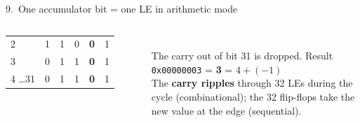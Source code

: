 \documentclass[aspectratio=169,11pt]{beamer}
\newcommand{\hx}[1]{\texttt{0x#1}}
\begin{document}
\begin{frame}{9.\ One accumulator bit = one LE in arithmetic mode}
\begin{columns}[T]
\begin{tabular}{@{}lccccc@{}}
      2 & 1 & 1 & 0 & \textbf{0} & 1 \\
      3 & 0 & 1 & 1 & \textbf{0} & 1 \\
      4 \ldots 31 & 0 & 1 & 1 & \textbf{0} & 1 \\
      \bottomrule
    \end{tabular}\\[2mm]
    The carry out of bit 31 is dropped. Result \hx{00000003} = \textbf{3} = $4 + (-1)$ \checkmark\\[1mm]
    The \textbf{carry ripples} through 32 LEs during the cycle (combinational); the 32 flip-flops take the new value
    at the edge (sequential).
  \end{columns}
\end{frame}

\end{document}

